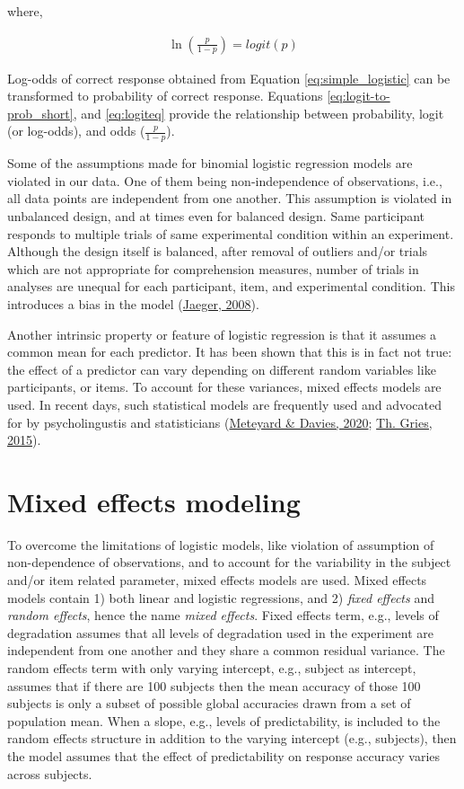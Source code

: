 \documentclass[a4paper, nobind]{templates/ociamthesis}
\begin{document}
where,

\begin{align} \label{eq:logiteq}
\ln(\frac{p}{1-p}) =
{logit}(p)
\end{align}

Log-odds of correct response obtained from Equation \ref{eq:simple_logistic} can be transformed to probability of correct response. Equations \ref{eq:logit-to-prob_short}, and \ref{eq:logiteq} provide the relationship between probability, logit (or log-odds), and odds (\(\frac{p}{1-p}\)).

Some of the assumptions made for binomial logistic regression models are violated in our data.
One of them being non-independence of observations, i.e., all data points are independent from one another.
This assumption is violated in unbalanced design, and at times even for balanced design.
Same participant responds to multiple trials of same experimental condition within an experiment.
Although the design itself is balanced, after removal of outliers and/or trials which are not appropriate for comprehension measures, number of trials in analyses are unequal for each participant, item, and experimental condition.
This introduces a bias in the model (\protect\hyperlink{ref-Jaeger2008}{Jaeger, 2008}).

Another intrinsic property or feature of logistic regression is that it assumes a common mean for each predictor.
It has been shown that this is in fact not true: the effect of a predictor can vary depending on different random variables like participants, or items.
To account for these variances, mixed effects models are used.
In recent days, such statistical models are frequently used and advocated for by psycholingustis and statisticians (\protect\hyperlink{ref-Meteyard2020}{Meteyard \& Davies, 2020}; \protect\hyperlink{ref-Gries2015}{Th. Gries, 2015}).

\hypertarget{mixed-effects-modeling}{%
\section{Mixed effects modeling}\label{mixed-effects-modeling}}

To overcome the limitations of logistic models, like violation of assumption of non-dependence of observations, and to account for the variability in the subject and/or item related parameter, mixed effects models are used.
Mixed effects models contain 1) both linear and logistic regressions, and 2) \emph{fixed effects} and \emph{random effects}, hence the name \emph{mixed effects}.
Fixed effects term, e.g., levels of degradation assumes that all levels of degradation used in the experiment are independent from one another and they share a common residual variance.
The random effects term with only varying intercept, e.g., subject as intercept, assumes that if there are 100 subjects then the mean accuracy of those 100 subjects is only a subset of possible global accuracies drawn from a set of population mean.
When a slope, e.g., levels of predictability, is included to the random effects structure in addition to the varying intercept (e.g., subjects), then the model assumes that the effect of predictability on response accuracy varies across subjects.
\end{document}
